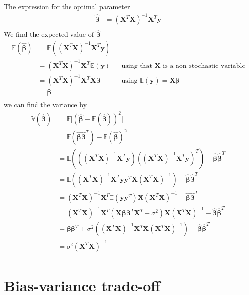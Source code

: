 The expression for the optimal parameter 
\begin{align*}
    \boldsymbol{\hat{\beta}} &= (\boldsymbol{X}^{T} \boldsymbol{X})^{-1} \boldsymbol{X}^{T} \boldsymbol{y} \\
\end{align*}
We find the expected value of $\boldsymbol{\hat{\beta}}$
\begin{align*}
    \mathbb{E}(\boldsymbol{\hat{\beta}}) &= \mathbb{E}((\boldsymbol{X}^{T} \boldsymbol{X})^{-1} \boldsymbol{X}^{T} \boldsymbol{y}) \\
    &= (\boldsymbol{X}^{T} \boldsymbol{X})^{-1} \boldsymbol{X}^{T} \mathbb{E}(\boldsymbol{y}) && \text{using that $\boldsymbol{X}$ is a non-stochastic variable} \\
    &= (\boldsymbol{X}^{T} \boldsymbol{X})^{-1} \boldsymbol{X}^{T} \boldsymbol{X} \boldsymbol{\beta} && \text{using $\mathbb{E}(\boldsymbol{y}) = \boldsymbol{X} \boldsymbol{\beta}$} \\
    &= \boldsymbol{\beta} \\
\end{align*}
we can find the variance by 
\begin{align*}
    \mathbb{V}(\boldsymbol{\hat{\beta}}) &= \mathbb{E} \big[ (\boldsymbol{\hat{\beta}} - \mathbb{E}(\boldsymbol{\hat{\beta}}))^{2} \big] \\
    &= \mathbb{E} (\boldsymbol{\hat{\beta}} \boldsymbol{\hat{\beta}}^{T}) - \mathbb{E}(\boldsymbol{\hat{\beta}})^{2}  \\
    &= \mathbb{E} (((\boldsymbol{X}^{T} \boldsymbol{X})^{-1} \boldsymbol{X}^{T} \boldsymbol{y}) ((\boldsymbol{X}^{T} \boldsymbol{X})^{-1} \boldsymbol{X}^{T} \boldsymbol{y})^{T}) - \boldsymbol{\hat{\beta}}\boldsymbol{\hat{\beta}}^{T}  \\
    &= \mathbb{E} ((\boldsymbol{X}^{T} \boldsymbol{X})^{-1} \boldsymbol{X}^{T} \boldsymbol{y} \boldsymbol{y}^{T} \boldsymbol{X} (\boldsymbol{X}^{T} \boldsymbol{X})^{-1}) - \boldsymbol{\hat{\beta}}\boldsymbol{\hat{\beta}}^{T}  \\
    &= (\boldsymbol{X}^{T} \boldsymbol{X})^{-1} \boldsymbol{X}^{T} \mathbb{E} (\boldsymbol{y} \boldsymbol{y}^{T}) \boldsymbol{X} (\boldsymbol{X}^{T} \boldsymbol{X})^{-1} - \boldsymbol{\hat{\beta}}\boldsymbol{\hat{\beta}}^{T}  \\
    &= (\boldsymbol{X}^{T} \boldsymbol{X})^{-1} \boldsymbol{X}^{T} (\boldsymbol{X} \boldsymbol{\beta} \boldsymbol{\beta}^{T} \boldsymbol{X}^{T} + \sigma^{2}) \boldsymbol{X} (\boldsymbol{X}^{T} \boldsymbol{X})^{-1} - \boldsymbol{\hat{\beta}}\boldsymbol{\hat{\beta}}^{T}  \\
    &= \boldsymbol{\beta} \boldsymbol{\beta}^{T} + \sigma^{2}((\boldsymbol{X}^{T} \boldsymbol{X})^{-1} \boldsymbol{X}^{T} \boldsymbol{X} (\boldsymbol{X}^{T} \boldsymbol{X})^{-1}) - \boldsymbol{\hat{\beta}}\boldsymbol{\hat{\beta}}^{T}  \\
    &= \sigma^{2}(\boldsymbol{X}^{T} \boldsymbol{X})^{-1} \\
\end{align*}


\section{Bias-variance trade-off}

